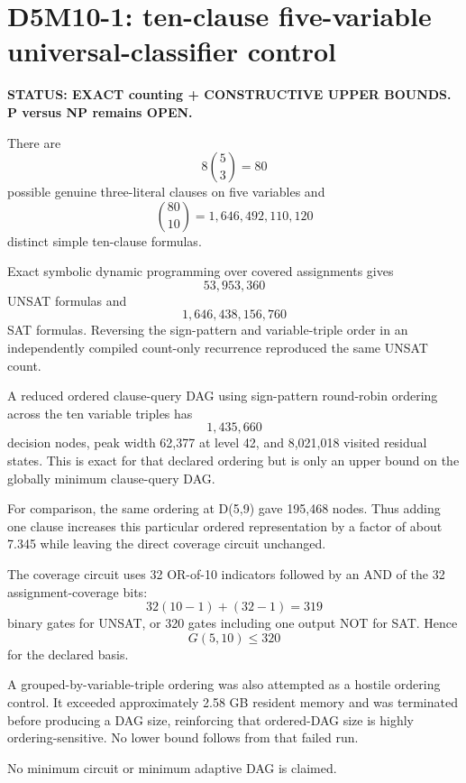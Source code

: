 \section*{D5M10-1: ten-clause five-variable universal-classifier control}

\textbf{STATUS: EXACT counting + CONSTRUCTIVE UPPER BOUNDS. P versus NP remains OPEN.}

There are
\[
8\binom53=80
\]
possible genuine three-literal clauses on five variables and
\[
\binom{80}{10}=1{,}646{,}492{,}110{,}120
\]
distinct simple ten-clause formulas.

Exact symbolic dynamic programming over covered assignments gives
\[
\boxed{53{,}953{,}360}
\]
UNSAT formulas and
\[
1{,}646{,}438{,}156{,}760
\]
SAT formulas. Reversing the sign-pattern and variable-triple order in an
independently compiled count-only recurrence reproduced the same UNSAT count.

A reduced ordered clause-query DAG using sign-pattern round-robin ordering across
the ten variable triples has
\[
\boxed{1{,}435{,}660}
\]
decision nodes, peak width 62,377 at level 42, and 8,021,018 visited residual
states. This is exact for that declared ordering but is only an upper bound on
the globally minimum clause-query DAG.

For comparison, the same ordering at D(5,9) gave 195,468 nodes. Thus adding one
clause increases this particular ordered representation by a factor of about
7.345 while leaving the direct coverage circuit unchanged.

The coverage circuit uses 32 OR-of-10 indicators followed by an AND of the
32 assignment-coverage bits:
\[
32(10-1)+(32-1)=319
\]
binary gates for UNSAT, or 320 gates including one output NOT for SAT. Hence
\[
G(5,10)\le320
\]
for the declared basis.

A grouped-by-variable-triple ordering was also attempted as a hostile ordering
control. It exceeded approximately 2.58 GB resident memory and was terminated
before producing a DAG size, reinforcing that ordered-DAG size is highly
ordering-sensitive. No lower bound follows from that failed run.

No minimum circuit or minimum adaptive DAG is claimed.

